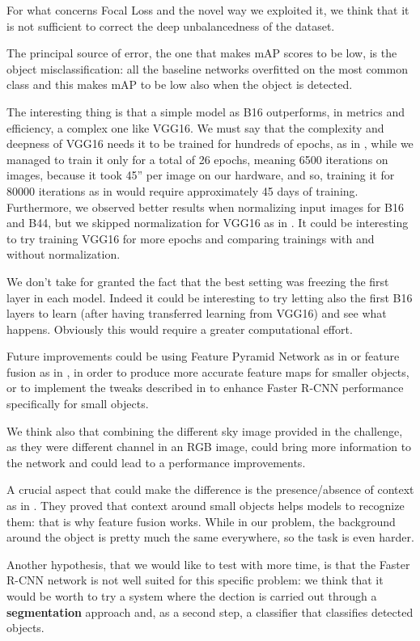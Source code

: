\documentclass[a4paper,10pt]{report}
\begin{document}
For what concerns Focal Loss and the novel way we exploited it, we think that it is not sufficient to correct the deep unbalancedness of the dataset.

The principal source of error, the one that makes mAP scores to be low, is the object misclassification: all the baseline networks overfitted on the most common class and this makes mAP to be low also when the object is detected.

The interesting thing is that a simple model as B16 outperforms, in metrics and efficiency, a complex one like VGG16.
We must say that the complexity and deepness of VGG16 needs it to be trained for hundreds of epochs, as in \cite{claran}, while we managed to train it only for a total of 26 epochs, meaning 6500 iterations on images, because it took 45'' per image on our hardware, and so, training it for 80000 iterations as in \cite{claran} would require approximately 45 days of training.
Furthermore, we observed better results when normalizing input images for B16 and B44, but we skipped normalization for VGG16 as in \cite{vgg}.
It could be interesting to try training VGG16 for more epochs and comparing trainings with and without normalization.

We don't take for granted the fact that the best setting was freezing the first layer in each model. 
Indeed it could be interesting to try letting also the first B16 layers to learn (after having transferred learning from VGG16) and see what happens. Obviously this would require a greater computational effort.

Future improvements could be using Feature Pyramid Network as in \cite{fpn} or feature fusion as in \cite{small-obj-detection-in-optical-remote-sensing}, in order to produce more accurate feature maps for smaller objects, or to implement the tweaks described in \cite{frcnn-small-obj} to enhance Faster R-CNN performance specifically for small objects.

We think also that combining the different sky image provided in the challenge, as they were different channel in an RGB image, could bring more information to the network and could lead to a performance improvements.

A crucial aspect that could make the difference is the presence/absence of context as in \cite{small-obj-detection-in-optical-remote-sensing}. They proved that context around small objects helps models to recognize them: that is why feature fusion works.
While in our problem, the background around the object is pretty much the same everywhere, so the task is even harder.

Another hypothesis, that we would like to test with more time, is that the Faster R-CNN network is not well suited for this specific problem: we think that it would be worth to try a system where the dection is carried out through a \textbf{segmentation} approach and, as a second step, a classifier that classifies detected objects.

\printbibliography
\end{document}
